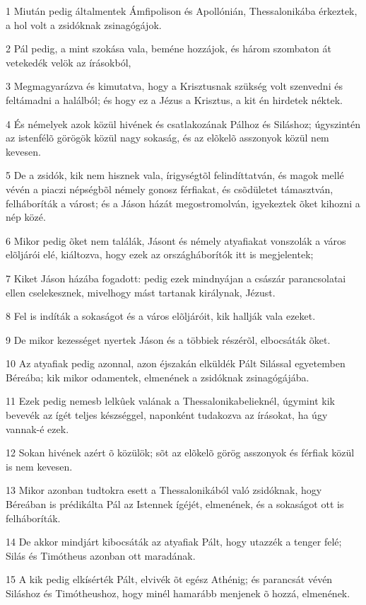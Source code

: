 \par 1 Miután pedig általmentek Ámfipolison és Apollónián, Thessalonikába érkeztek, a hol volt a zsidóknak zsinagógájok.
\par 2 Pál pedig, a mint szokása vala, beméne hozzájok, és három szombaton át vetekedék velök az írásokból,
\par 3 Megmagyarázva és kimutatva, hogy a Krisztusnak szükség volt szenvedni és feltámadni a halálból; és hogy ez a Jézus a Krisztus,  a kit én hirdetek néktek.
\par 4 És némelyek azok közül hivének és csatlakozának Pálhoz és Siláshoz; úgyszintén az istenfélõ görögök közül nagy sokaság, és az elõkelõ asszonyok közül nem kevesen.
\par 5 De a zsidók, kik nem hisznek vala, írigységtõl felindíttatván, és magok mellé vévén a piaczi népségbõl némely gonosz férfiakat, és csõdületet támasztván, felháboríták a várost; és a Jáson házát megostromolván, igyekeztek õket kihozni a nép közé.
\par 6 Mikor pedig õket nem találák, Jásont és némely atyafiakat vonszolák a város elõljárói elé, kiáltozva, hogy ezek az országháborítók itt is megjelentek;
\par 7 Kiket Jáson házába fogadott: pedig ezek mindnyájan a császár parancsolatai ellen cselekesznek, mivelhogy mást tartanak királynak, Jézust.
\par 8 Fel is indíták a sokaságot és a város elõljáróit, kik hallják vala ezeket.
\par 9 De mikor kezességet nyertek Jáson és a többiek részérõl, elbocsáták õket.
\par 10 Az atyafiak pedig azonnal, azon éjszakán elküldék Pált Silással egyetemben Béreába; kik mikor odamentek, elmenének a zsidóknak zsinagógájába.
\par 11 Ezek pedig nemesb lelkûek valának a Thessalonikabelieknél, úgymint kik bevevék az ígét teljes készséggel, naponként tudakozva az írásokat, ha úgy vannak-é ezek.
\par 12 Sokan hivének azért õ közülök; sõt az elõkelõ görög asszonyok és férfiak közül is nem kevesen.
\par 13 Mikor azonban tudtokra esett a Thessalonikából való zsidóknak, hogy Béreában is prédikálta Pál az Istennek ígéjét, elmenének, és a sokaságot ott is felháboríták.
\par 14 De akkor mindjárt kibocsáták az atyafiak Pált, hogy utazzék a tenger felé; Silás és Timótheus azonban ott maradának.
\par 15 A kik pedig elkísérték Pált, elvivék õt egész Athénig; és parancsát vévén Siláshoz és Timótheushoz, hogy minél hamarább menjenek õ hozzá, elmenének.
